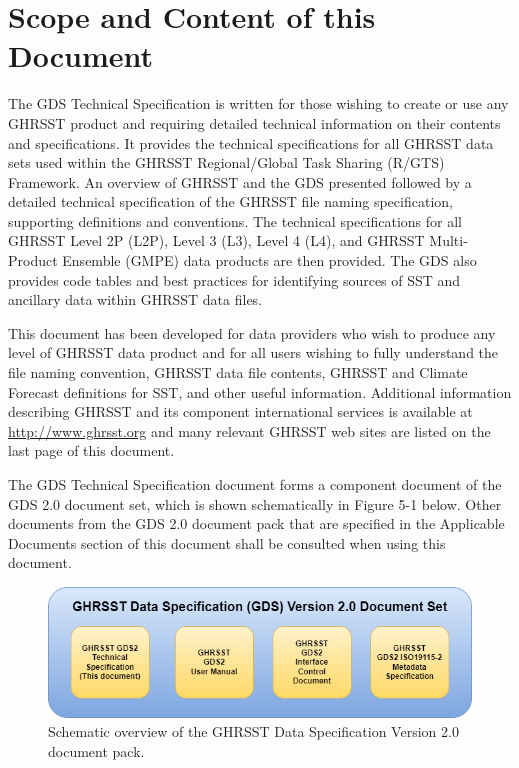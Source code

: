 \pagebreak
\section{Scope and Content of this Document}


{\selectfont The GDS Technical Specification is written for those wishing to create or use any GHRSST product
and requiring detailed technical information on their contents and specifications. It provides the
technical specifications for all GHRSST data sets used within the GHRSST Regional/Global Task
Sharing (R/GTS) Framework. An overview of GHRSST and the GDS presented followed by a detailed
technical specification of the GHRSST file naming specification, supporting definitions and
conventions. The technical specifications for all GHRSST Level 2P (L2P), Level 3 (L3), Level 4 (L4),
and GHRSST Multi-Product Ensemble (GMPE) data products are then provided. The GDS also
provides code tables and best practices for identifying sources of SST and ancillary data within
GHRSST data files.}

\par\vspace{0.25cm}

\noindent This document has been developed for data providers who wish to produce any level of GHRSST
data product and for all users wishing to fully understand the file naming convention, GHRSST data
file contents, GHRSST and Climate Forecast definitions for SST, and other useful information.
Additional information describing GHRSST and its component international services is available at
\url{http://www.ghrsst.org} and many relevant GHRSST web sites are listed on the last page of this
document.
\par\vspace{0.25cm}
\noindent The GDS Technical Specification document forms a component document of the GDS 2.0 document
set, which is shown schematically in Figure 5-1 below. Other documents from the GDS 2.0 document
pack that are specified in the Applicable Documents section of this document shall be consulted when
using this document. 
\par\vspace{0.25cm}
\begin{figure}[h]
    \centering
    \includegraphics[width=1 \textwidth]{../images/schematicOverview.drawio.png}
    \caption{Schematic overview of the GHRSST Data Specification Version 2.0 document pack.}
    \label{fig:schematic_overview}
\end{figure}